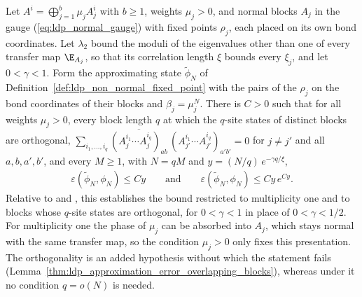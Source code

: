 \begin{lemma}
    \label{thm:ldp_approximation_error_orthogonal_blocks}
    \leanok
    Let $A^i=\bigoplus_{j=1}^b\mu_jA_j^i$ with $b\geq1$, weights $\mu_j>0$, and
    normal blocks $A_j$ in the gauge (\ref{eq:ldp_normal_gauge}) with fixed
    points $\rho_j$, each placed on its own bond coordinates. Let $\lambda_2$
    bound the moduli of the eigenvalues other than one of every transfer map
    $\E_{A_j}$, so that its correlation length $\xi$ bounds every $\xi_j$, and
    let $0<\gamma<1$. Form the approximating state $\widetilde\phi_N$ of
    Definition~\ref{def:ldp_non_normal_fixed_point} with the pairs of the
    $\rho_j$ on the bond coordinates of their blocks and $\beta_j=\mu_j^N$.
    There is $C>0$ such that for all weights $\mu_j>0$, every block length $q$
    at which the $q$-site states of distinct blocks are orthogonal,
    $\sum_{i_1,\dots,i_q}\overline{(A_j^{i_1}\cdots A_j^{i_q})_{ab}}\,
        (A_{j'}^{i_1}\cdots A_{j'}^{i_q})_{a'b'}=0$ for $j\neq j'$ and all
    $a,b,a',b'$, and every $M\geq1$, with $N=qM$ and
    $y=(N/q)\,e^{-\gamma q/\xi}$,
    \begin{align}
        \varepsilon(\widetilde\phi_N,\phi_N)\leq Cy
        \qquad\text{and}\qquad
        \varepsilon(\widetilde\phi_N,\phi_N)\leq Cy\,e^{Cy}.
        \label{eq:ldp_approximation_error_orthogonal_blocks}
    \end{align}
    Relative to \cite[Lemma~1$'$(ii)]{Malz2024Preparation} and
    \cite{gap:mswc24_block_form_mixed_overlap}, this establishes the bound
    restricted to multiplicity one and to blocks whose $q$-site states are
    orthogonal, for $0<\gamma<1$ in place of $0<\gamma<1/2$. For
    multiplicity one the phase of $\mu_j$ can be absorbed into $A_j$, which
    stays normal with the same transfer map, so the condition $\mu_j>0$ only
    fixes this presentation. The orthogonality is an added hypothesis without
    which the statement fails
    (Lemma~\ref{thm:ldp_approximation_error_overlapping_blocks}), whereas
    under it no condition $q=o(N)$ is needed.
\end{lemma}
